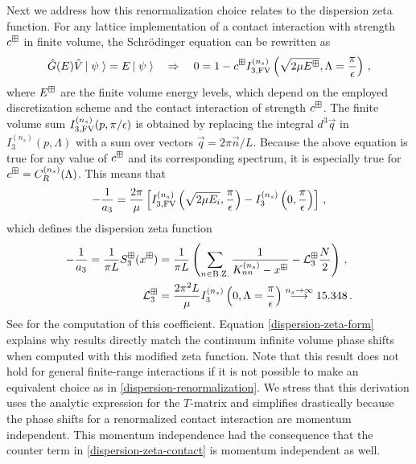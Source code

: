 Next we address how this renormalization choice relates to the dispersion zeta function.
For any lattice implementation of a contact interaction with strength $c^\boxplus$ in finite volume, the Schr\"odinger equation can be rewritten as
\begin{equation}\label{eq:schroe}
	\hat G(E) \hat V \left|\;\psi\;\right\rangle = E\left|\;\psi\;\right\rangle
	\quad \Rightarrow \quad
	0 = 1 - c^\boxplus I_{3, \textrm{FV}}^{(n_s)}\left(\sqrt{2 \mu E^\boxplus}, \Lambda = \frac{\pi}{\epsilon}\right) \, ,
\end{equation}
where $E^\boxplus$ are the finite volume energy levels, which depend on the employed discretization scheme and the contact interaction of strength $c^\boxplus$.
The finite volume sum $I_{3, \textrm{FV}}^{(n_s)}(p, \pi/\epsilon)$ is obtained by replacing the integral $d^3 \vec q$ in $I_3^{(n_s)}(p, \Lambda)$ with a sum  over vectors $\vec q = 2 \pi \vec n / L$.
Because the above equation is true for any value of $c^\boxplus$ and its corresponding spectrum, it is especially true for $c^\boxplus = C_R^{(n_s)}(\Lambda)$.
This means that
\begin{equation}
	- \frac{1}{a_3}
	=
	\frac{2 \pi}{\mu}
		\left[
		I_{3, \textrm{FV}}^{(n_s)}\left(\sqrt{2 \mu E_i}, \frac{\pi}{\epsilon}\right)
		- I_3^{(n_s)}\left(0, \frac{\pi}{\epsilon}\right)
		\right]
	\, ,
\end{equation}
which defines the dispersion zeta function
\begin{align}\label{eq:dispersion-zeta-form}
	- \frac{1}{a_3}
	=
	\frac{1}{\pi L}
	S^{\boxplus}_3(x^\boxplus)
	&=\frac{1}{\pi L}\left(\sum\limits_{n \in \text{B.Z.}}\frac{1}{K_{nn}^{(n_s)} - x^\boxplus} - \mathcal{L}_3^{\boxplus} \frac{N}{2}\right)
	\, ,
	\\ \label{eq:dispersion-zeta-contact}
	\mathcal{L}_3^\boxplus
	&=
	\frac{2 \pi^2 L}{\mu}
	I_3^{(n_s)}\left(0, \Lambda = \frac{\pi}{\epsilon}\right)
	\overset{n_s\to\infty}{\longrightarrow} 15.348
	\, .
\end{align}
See  for the computation of this coefficient.
Equation \eqref{dispersion-zeta-form} explains why results directly match the continuum infinite volume phase shifts when computed with this modified zeta function.
Note that this result does not hold for general finite-range interactions if it is not possible to make an equivalent choice as in \eqref{dispersion-renormalization}.
We stress that this derivation uses the analytic  expression for the $T$-matrix and simplifies drastically because the phase shifts for a renormalized contact interaction are momentum independent.
This momentum independence had the consequence that the counter term in \eqref{dispersion-zeta-contact} is momentum independent as well.

